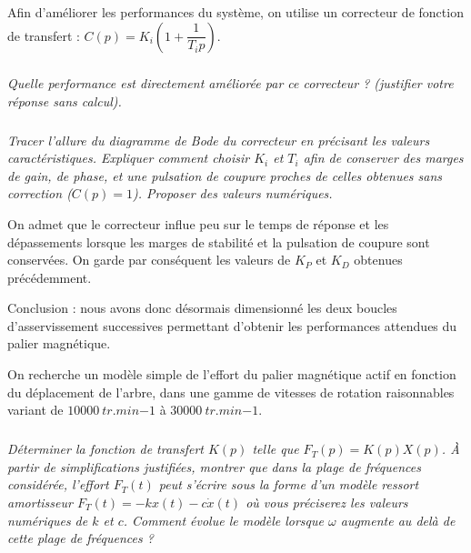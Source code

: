 Afin d'améliorer les performances du système, on utilise un correcteur de fonction
de transfert : $C(p)=K_i\left(1+\dfrac{1}{T_i p} \right)$.

\subparagraph{}\textit{Quelle performance est directement améliorée par ce correcteur ? (justifier
votre réponse sans calcul).}
\ifprof
\begin{corrige}

\end{corrige}
\else
\fi

\subparagraph{}\textit{Tracer l'allure du diagramme de Bode du correcteur en précisant les
valeurs caractéristiques. Expliquer comment choisir $K_i$ et $T_i$ afin de conserver
des marges de gain, de phase, et une pulsation de coupure proches de celles obtenues
sans correction ($C(p)=1$). Proposer des valeurs numériques.}
\ifprof
\begin{corrige}

\end{corrige}
\else
\fi

On admet que le correcteur influe peu sur le temps de réponse et les dépassements
lorsque les marges de stabilité et la pulsation de coupure sont conservées.
On garde par conséquent les valeurs de $K_P$ et $K_D$ obtenues précédemment.

Conclusion : nous avons donc désormais dimensionné les deux boucles d'asservissement
successives permettant d'obtenir les performances attendues du palier
magnétique.

On recherche un modèle simple de l'effort du palier magnétique actif en fonction du
déplacement de l'arbre, dans une gamme de vitesses de rotation raisonnables
variant de $\SI{10000}{tr.min{-1}}$ à $\SI{30000}{tr.min{-1}}$.

\subparagraph{}\textit{Déterminer la fonction de transfert $K(p)$ telle que $F_T(p)=K(p)X(p)$.
À partir de simplifications justifiées, montrer que dans la plage de fréquences
considérée, l'effort $F_T(t)$ peut s'écrire sous la forme d'un modèle ressort amortisseur
$F_T(t)=-kx(t)-c\dot{x}(t)$ où vous préciserez les valeurs numériques de $k$ et $c$. Comment évolue le modèle lorsque
$\omega$ augmente au delà de cette plage de fréquences ?}
\ifprof
\begin{corrige}

\end{corrige}
\else
\fi


